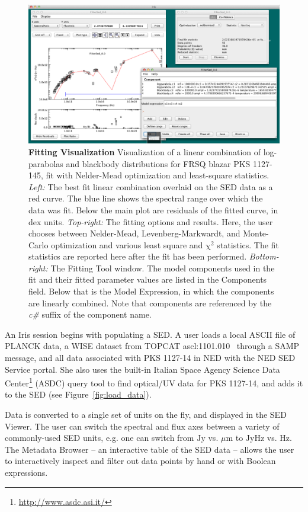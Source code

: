 \documentclass[final,5p,authoryear]{elsarticle}
\begin{document}
\begin{figure} \centering
\includegraphics[height=0.3\textheight]{figures/fitting-1.png}
\caption{\textbf{Fitting Visualization} Visualization of a linear combination of
log-parabolas and blackbody distributions for FRSQ blazar PKS 1127-145, fit with
Nelder-Mead optimization and least-square statistics. \textit{Left:} The best fit
linear combination overlaid on the SED data as a red curve. The blue line shows
the spectral range over which the data was fit. Below the main plot are
residuals of the fitted curve, in dex units. \textit{Top-right:} The fitting
options and results. Here, the user chooses between Nelder-Mead,
Levenberg-Markwardt, and Monte-Carlo \citep[Differential Evolution, ][]{Storn:1997:DEN:596061.596146}
optimization and various least square and
$\mathrm{\chi}^{2}$ statistics. The fit statistics are reported here after the
fit has been performed. \textit{Bottom-right:} The Fitting Tool window. The
model components used in the fit and their fitted parameter values are listed in
the Components field. Below that is the Model Expression, in which the
components are linearly combined. Note that components are referenced by the
\textit{c\#} suffix of the component name.} \label{fig:fitting1} \end{figure}

An Iris session begins with populating a SED. A user loads a local ASCII file of
PLANCK data, a WISE dataset from TOPCAT ascl:1101.010~\citep{2005ASPC..347...29T} through a
SAMP message, and all data associated with PKS 1127-14 in NED with the NED SED
Service portal. She also uses the built-in Italian Space Agency Science Data
Center\footnote{\url{http://www.asdc.asi.it/}} (ASDC) query tool to find
optical/UV data for PKS 1127-14, and adds it to the SED (see
Figure~\ref{fig:load_data}).

Data is converted to a single set of units on the fly, and displayed in the SED
Viewer. The user can switch the spectral and flux axes between a variety of
commonly-used SED units, e.g. one can switch from $\mathrm{Jy}$ vs.
${\mu}\mathrm{m}$ to $\mathrm{Jy}\mathrm{Hz}$ vs. $\mathrm{Hz}$. The Metadata
Browser -- an interactive table of the SED data -- allows the user to
interactively inspect and filter out data points by hand or with Boolean
expressions.
\end{document}
